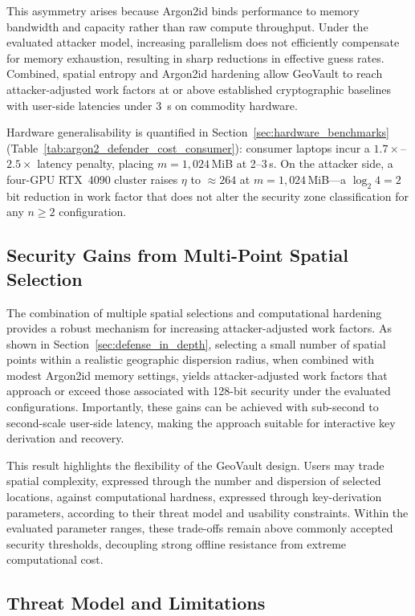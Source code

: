\documentclass[journal,article,accept,pdftex,moreauthors]{Definitions/mdpi}
\begin{document}
This asymmetry arises because Argon2id binds performance to memory bandwidth and capacity rather than raw compute throughput. Under the evaluated attacker model, increasing parallelism does not efficiently compensate for memory exhaustion, resulting in sharp reductions in effective guess rates. Combined, spatial entropy and Argon2id hardening allow GeoVault to reach attacker-adjusted work factors at or above established cryptographic baselines with user-side latencies under 3~s on commodity hardware.

Hardware generalisability is quantified in Section~\ref{sec:hardware_benchmarks} (Table~\ref{tab:argon2_defender_cost_consumer}): consumer laptops incur a $1.7\times$--$2.5\times$ latency penalty, placing $m=1{,}024$\,MiB at 2--3\,s. On the attacker side, a four-GPU RTX~4090 cluster raises $\eta$ to $\approx 264$ at $m=1{,}024$\,MiB---a $\log_2 4 = 2$\,bit reduction in work factor that does not alter the security zone classification for any $n \geq 2$ configuration.

\subsection{Security Gains from Multi-Point Spatial Selection}

The combination of multiple spatial selections and computational hardening provides a robust mechanism for increasing attacker-adjusted work factors. As shown in Section~\ref{sec:defense_in_depth}, selecting a small number of spatial points within a realistic geographic dispersion radius, when combined with modest Argon2id memory settings, yields attacker-adjusted work factors that approach or exceed those associated with 128-bit security under the evaluated configurations. Importantly, these gains can be achieved with sub-second to second-scale user-side latency, making the approach suitable for interactive key derivation and recovery.

This result highlights the flexibility of the GeoVault design. Users may trade spatial complexity, expressed through the number and dispersion of selected locations, against computational hardness, expressed through key-derivation parameters, according to their threat model and usability constraints. Within the evaluated parameter ranges, these trade-offs remain above commonly accepted security thresholds, decoupling strong offline resistance from extreme computational cost.

\subsection{Threat Model and Limitations}
\end{document}
